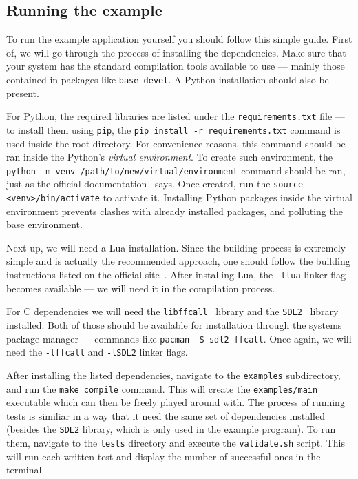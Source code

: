 \documentclass[polish, english]{iithesis}
\begin{document}
    \subsection{Running the example}
      To run the example application yourself you should follow this simple guide.
      First of, we will go through the process of installing the dependencies.
      Make sure that your system has the standard compilation tools available to use --- mainly those contained in packages like \texttt{base-devel}.
      A Python installation should also be present.

      For Python, the required libraries are listed under the \texttt{requirements.txt} file --- to install them using \texttt{pip}, the \texttt{pip install -r requirements.txt} command is used inside the root directory.
      For convenience reasons, this command should be ran inside the Python's \textit{virtual environment}.
      To create such environment, the \texttt{python -m venv /path/to/new/virtual/environment} command should be ran, just as the official documentation~\cite{venv} says.
      Once created, run the \texttt{source <venv>/bin/activate} to activate it.
      Installing Python packages inside the virtual environment prevents clashes with already installed packages, and polluting the base environment.

      Next up, we will need a Lua installation.
      Since the building process is extremely simple and is actually the recommended approach, one should follow the building instructions listed on the official site~\cite{lua-web}.
      After installing Lua, the \texttt{-llua} linker flag becomes available --- we will need it in the compilation process.

      For C dependencies we will need the \texttt{libffcall}~\cite{ffcall} library and the \texttt{SDL2}~\cite{sdl2} library installed.
      Both of those should be available for installation through the systems package manager --- commands like \texttt{pacman -S sdl2 ffcall}.
      Once again, we will need the \texttt{-lffcall} and \texttt{-lSDL2} linker flags.
      
      After installing the listed dependencies, navigate to the \texttt{examples} subdirectory, and run the \texttt{make compile} command.
      This will create the \texttt{examples/main} executable which can then be freely played around with.
      The process of running tests is similiar in a way that it need the same set of dependencies installed (besides the \texttt{SDL2} library, which is only used in the example program).
      To run them, navigate to the \texttt{tests} directory and execute the \texttt{validate.sh} script.
      This will run each written test and display the number of successful ones in the terminal.
\end{document}
